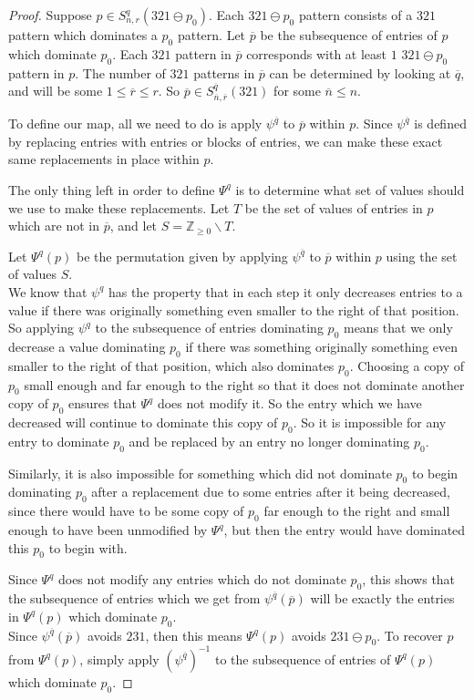 \documentclass[11pt]{amsart}
\theoremstyle{remark}
\numberwithin{equation}{section}
\begin{document}
\begin{proof}
    Suppose $p \in S_{n,r}^q(321 \ominus p_0)$. Each $321 \ominus p_0$ pattern consists of a $321$ pattern which dominates a $p_0$ pattern. Let $\overline{p}$ be the subsequence of entries of $p$ which dominate $p_0$. Each $321$ pattern in $\overline{p}$ corresponds with at least $1$ $321 \ominus p_0$ pattern in $p$. The number of $321$ patterns in $\overline{p}$ can be determined by looking at $\overline{q}$, and will be some $1 \leq \overline{r} \leq r$. So $\overline{p} \in S_{\overline{n},\overline{r}}^{\overline{q}}(321)$ for some $\overline{n} \leq n$.
    
    To define our map, all we need to do is apply $\psi^{\overline{q}}$ to $\overline{p}$ within $p$. Since $\psi^{\overline{q}}$ is defined by replacing entries with entries or blocks of entries, we can make these exact same replacements in place within $p$.
    
    The only thing left in order to define $\Psi^q$ is to determine what set of values should we use to make these replacements. Let $T$ be the set of values of entries in $p$ which are not in $\overline{p}$, and let $S = \mathbb{Z}_{\geq 0} \backslash T$.
    
    Let $\Psi^q(p)$ be the permutation given by applying $\psi^{\overline{q}}$ to $\overline{p}$ within $p$ using the set of values $S$.
    \\

    We know that $\psi^q$ has the property that in each step it only decreases entries to a value if there was originally something even smaller to the right of that position. So applying $\psi^q$ to the subsequence of entries dominating $p_0$ means that we only decrease a value dominating $p_0$ if there was something originally something even smaller to the right of that position, which also dominates $p_0$. Choosing a copy of $p_0$ small enough and far enough to the right so that it does not dominate another copy of $p_0$ ensures that $\Psi^q$ does not modify it. So the entry which we have decreased will continue to dominate this copy of $p_0$. So it is impossible for any entry to dominate $p_0$ and be replaced by an entry no longer dominating $p_0$. 
    
    Similarly, it is also impossible for something which did not dominate $p_0$ to begin dominating $p_0$ after a replacement due to some entries after it being decreased, since there would have to be some copy of $p_0$ far enough to the right and small enough to have been unmodified by $\Psi^q$, but then the entry would have dominated this $p_0$ to begin with. 
    
    Since $\Psi^q$ does not modify any entries which do not dominate $p_0$, this shows that the subsequence of entries which we get from $\psi^{\overline{q}}(\overline{p})$ will be exactly the entries in $\Psi^q(p)$ which dominate $p_0$. 
    \\

    Since $\psi^{\overline{q}}(\overline{p})$ avoids $231$, then this means $\Psi^q(p)$ avoids $231 \ominus p_0$. To recover $p$ from $\Psi^q(p)$, simply apply $(\psi^{\overline{q}})^{-1}$ to the subsequence of entries of $\Psi^q(p)$ which dominate $p_0$.
\end{proof}
\end{document}
